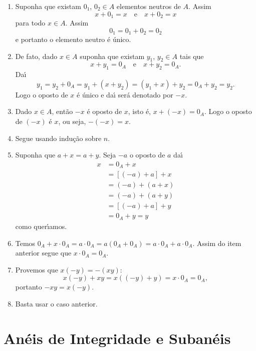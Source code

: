 \begin{prova}
	\begin{enumerate}[label={\roman*})]
		\item Suponha que existam $0_1$, $0_2\in A$ elementos neutros de $A$. Assim
		\[
			x + 0_1 = x \quad \mbox{e}\quad x + 0_2 = x	
		\]
		para todo $x \in A$. Assim
		\[
			0_1 = 0_1 + 0_2 = 0_2
		\]
		e portanto o elemento neutro \'e \'unico.

		\item De fato, dado $x \in A$ suponha que existam $y_1$, $y_2\in A$ tais que
		\[
			x + y_1 = 0_A \quad \mbox{e}\quad x + y_2 = 0_A.
		\]
		Da{\'\i}
		\[
			y_1 = y_2 + 0_A = y_1 + (x + y_2) = (y_1 + x) + y_2 = 0_A + y_2 =y_2.
		\]
		Logo o oposto de $x$ \'e \'unico  e da{\'\i} ser\'a denotado por $-x$.
		
		\item Dado $x \in A$, ent\~ao $-x$ {\'e} oposto de $x$, isto {\'e}, $x + (-x) = 0_A$. Logo o oposto de $(-x)$ {\'e} $x$, ou seja, $-(-x) = x$.

		\item Segue usando indu\c{c}\~ao sobre $n$.

		\item Suponha que $a + x = a + y$. Seja $-a$ o oposto de $a$ da{\'\i}
		\begin{align*}
			x &= 0_A + x \\ &= [(-a) + a] + x\\ &= (-a) + (a + x) \\ &= (-a) + (a + y) \\ &= [(-a) + a] + y \\ &= 0_A + y = y
		\end{align*}
		como quer{\'\i}amos.

		\item Temos $0_A + x\cdot 0_A = a\cdot 0_A = a(0_A + 0_A) = a\cdot 0_A + a\cdot 0_A$. Assim do item anterior segue que $x\cdot 0_A = 0_A$.

		\item Provemos que $x(-y) = -(xy)$:
		\[
			x(-y) + xy = x((-y) + y) = x\cdot 0_A = 0_A,
		\]
		portanto $-xy = x(-y)$.

		\item Basta usar o caso anterior.
	\end{enumerate}
\end{prova}

\section{An\'eis de Integridade e Suban\'eis} %
\label{sec:aneis_de_integridade_e_subaneis}

